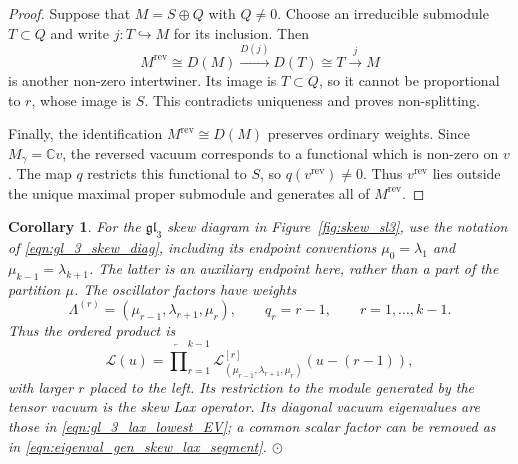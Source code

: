 \documentclass[12pt,reqno]{amsart}
\newcommand{\C}{{\mathbb C}}
\numberwithin{equation}{section}
\newtheorem{cor}[thm]{Corollary}
\begin{document}
\begin{proof}
Suppose that $M=S\oplus Q$ with $Q\neq0$. Choose an irreducible
submodule $T\subset Q$ and write $j:T\hookrightarrow M$ for its
inclusion. Then
\begin{equation*}
    M^{\mathrm{rev}}\cong D(M)
    \overset{D(j)}{\longrightarrow}D(T)
    \cong T\overset{j}{\longrightarrow}M
\end{equation*}
is another non-zero intertwiner. Its image is $T\subset Q$,
so it cannot be proportional to $r$, whose image is $S$.
This contradicts uniqueness and proves non-splitting.

Finally, the identification $M^{\mathrm{rev}}\cong D(M)$
preserves ordinary weights. Since $M_\gamma=\C v$, the reversed
vacuum corresponds to a functional which is non-zero on $v$.
The map $q$ restricts this functional to $S$, so
$q(v^{\mathrm{rev}})\neq0$. Thus $v^{\mathrm{rev}}$ lies outside
the unique maximal proper submodule and generates all of
$M^{\mathrm{rev}}$.
\end{proof}

\begin{cor}\label{cor:Osc_snake_Lax_sl3}
	For the $\mathfrak{gl}_3$ skew diagram in
	Figure~\ref{fig:skew_sl3}, use the notation of
	\eqref{eqn:gl_3_skew_diag}, including its endpoint conventions
	$\mu_0=\lambda_1$ and $\mu_{k-1}=\lambda_{k+1}$.
	The latter is an auxiliary endpoint here, rather than a part
	of the partition $\mu$. The oscillator factors have weights
	\begin{equation*}
		\Lambda^{(r)}=(\mu_{r-1},\lambda_{r+1},\mu_r),
		\qquad q_r=r-1,\qquad r=1,\ldots,k-1.
	\end{equation*}
	Thus the ordered product is
	\begin{equation*}
		\mathcal L(u)=\overleftarrow{\prod}_{r=1}^{k-1}
		\mathcal L^{[r]}_{(\mu_{r-1},\lambda_{r+1},\mu_r)}(u-(r-1)),
	\end{equation*}
	with larger $r$ placed to the left.
	Its restriction to the module generated by the tensor vacuum
	is the skew Lax operator. Its diagonal vacuum eigenvalues are
	those in \eqref{eqn:gl_3_lax_lowest_EV}; a common scalar factor
	can be removed as in \eqref{eqn:eigenval_gen_skew_lax_segment}.
	$\odot$
\end{cor}
\end{document}
